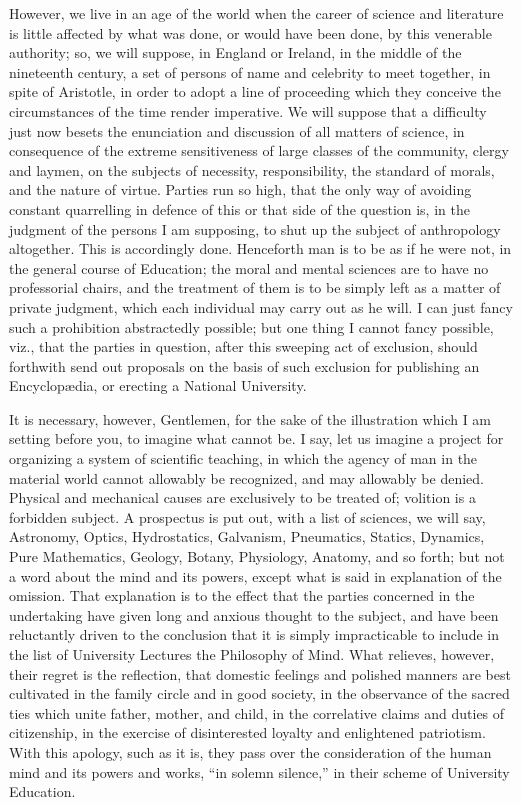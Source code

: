 However, we live in an age of the world when the career of science
and literature is little affected by what was done, or would have been
done, by this venerable authority; so, we will suppose, in England or
Ireland, in the middle of the nineteenth century, a set of persons of
name and celebrity to meet together, in spite of Aristotle, in order
to adopt a line of proceeding which they conceive the circumstances of
the time render imperative. We will suppose that a difficulty just now
besets the enunciation and discussion of all matters of science, in
consequence of the extreme sensitiveness of large classes of the
community, clergy and laymen, on the subjects of necessity,
responsibility, the standard of morals, and the nature of virtue.
Parties run so high, that the only way of avoiding constant
quarrelling in defence of this or that side of the question is, in the
judgment of the persons I am supposing, to shut up the subject of
anthropology altogether. This is accordingly done. Henceforth man is
to be as if he were not, in the general course of Education; the moral
and mental sciences are to have no professorial chairs, and the
treatment of them is to be simply left as a matter of private
judgment, which each individual may carry out as he will. I can just
fancy such a prohibition abstractedly possible; but one thing I cannot
fancy possible, viz., that the parties in question, after this
sweeping act of exclusion, should forthwith send out proposals on the
basis of such exclusion for publishing an Encyclopædia, or erecting a
National University.

It is necessary, however, Gentlemen, for the sake of the
illustration which I am setting before you, to imagine what cannot be.
I say, let us imagine a project for organizing a system of scientific
teaching, in which the agency of man in the material world cannot
allowably be recognized, and may allowably be denied. Physical and
mechanical causes are exclusively to be treated of; volition is a
forbidden subject. A prospectus is put out, with a list of sciences,
we will say, Astronomy, Optics, Hydrostatics, Galvanism, Pneumatics,
Statics, Dynamics, Pure Mathematics, Geology, Botany, Physiology,
Anatomy, and so forth; but not a word about the mind and its powers,
except what is said in explanation of the omission. That explanation
is to the effect that the parties concerned in the undertaking have
given long and anxious thought to the subject, and have been
reluctantly driven to the conclusion that it is simply impracticable
to include in the list of University Lectures the Philosophy of Mind.
What relieves, however, their regret is the reflection, that domestic
feelings and polished manners are best cultivated in the family circle
and in good society, in the observance of the sacred ties which unite
father, mother, and child, in the correlative claims and duties of
citizenship, in the exercise of disinterested loyalty and enlightened
patriotism. With this apology, such as it is, they pass over the
consideration of the human mind and its powers and works, ``in
solemn silence,'' in their scheme of University Education.

